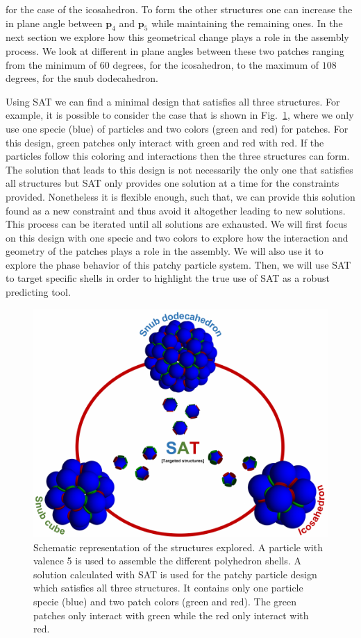 \documentclass[a4paper, amsfonts, amssymb, amsmath, reprint, showkeys, nofootinbib, twoside]{revtex4-1}
\begin{document}
\noindent for the case of the icosahedron. To form the other structures one can increase the in plane angle between $\textbf{p}_4$ and $\textbf{p}_5$ while maintaining the remaining ones. In the next section we explore how this geometrical change plays a role in the assembly process. We look at different in plane angles between these two patches ranging from the minimum of $60$ degrees, for the icosahedron, to the maximum of $108$ degrees, for the snub dodecahedron.

Using SAT we can find a minimal design that satisfies all three structures. For example, it is possible to consider the case that is shown in Fig.~\ref{SAT}, where we only use one specie (blue) of particles and two colors (green and red) for patches. For this design, green patches only interact with green and red with red. If the particles follow this coloring and interactions then the three structures can form. The solution that leads to this design is not necessarily the only one that satisfies all structures but SAT only provides one solution at a time for the constraints provided. Nonetheless it is flexible enough, such that, we can provide this solution found as a new constraint and thus avoid it altogether leading to new solutions. This process can be iterated until all solutions are exhausted. We will first focus on this design with one specie and two colors to explore how the interaction and geometry of the patches plays a role in the assembly. We will also use it to explore the phase behavior of this patchy particle system. Then, we will use SAT to target specific shells in order to highlight the true use of SAT as a robust predicting tool.

\begin{figure}[t]
	\includegraphics{fig1.pdf}
	\caption{\label{SAT} Schematic representation of the structures explored. A particle with valence 5 is used to assemble the different polyhedron shells. A solution calculated with SAT is used for the patchy particle design which satisfies all three structures. It contains only one particle specie (blue) and two patch colors (green and red). The green patches only interact with green while the red only interact with red.}
\end{figure}
\end{document}
